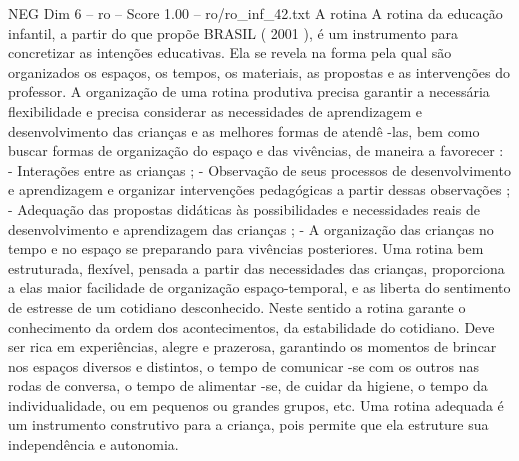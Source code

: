 \begin{textsample}{NEG Dim 6 – ro – Score 1.00 – ro/ro\_inf\_42.txt}  \label{ex:f6_neg_153}
A rotina A rotina da educação infantil, a partir do que propõe BRASIL ( 2001 ), é um instrumento para concretizar as intenções educativas.
Ela se revela na forma pela qual são organizados os espaços, os tempos, os materiais, as propostas e as intervenções do professor.
A organização de uma rotina produtiva precisa garantir a necessária flexibilidade e precisa considerar as necessidades de aprendizagem e desenvolvimento das crianças e as melhores formas de atendê -las, bem como buscar formas de organização do espaço e das vivências, de maneira a favorecer : - Interações entre as crianças ; - Observação de seus processos de desenvolvimento e aprendizagem e organizar intervenções pedagógicas a partir dessas observações ; - Adequação das propostas didáticas às possibilidades e necessidades reais de desenvolvimento e aprendizagem das crianças ; - A organização das crianças no tempo e no espaço se preparando para vivências posteriores.
Uma rotina bem estruturada, flexível, pensada a partir das necessidades das crianças, proporciona a elas maior facilidade de organização espaço-temporal, e as liberta do sentimento de estresse de um cotidiano desconhecido.
Neste sentido a rotina garante o conhecimento da ordem dos acontecimentos, da estabilidade do cotidiano.
Deve ser rica em experiências, alegre e prazerosa, garantindo os momentos de brincar nos espaços diversos e distintos, o tempo de comunicar -se com os outros nas rodas de conversa, o tempo de alimentar -se, de cuidar da higiene, o tempo da individualidade, ou em pequenos ou grandes grupos, etc.
Uma rotina adequada é um instrumento construtivo para a criança, pois permite que ela estruture sua independência e autonomia.

\end{textsample}
